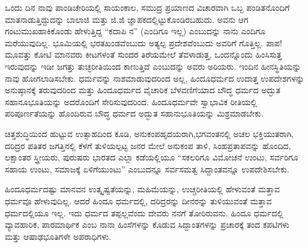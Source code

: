 ಒಂದು ದಿನ ನಾವು ಪಾಂಡಿಚೇರಿಯಲ್ಲಿ ಸಾಯಂಕಾಲ, ಸಮುದ್ರ ಪ್ರಯಾಣದ ವಿಚಾರವಾಗಿ ಒಬ್ಬ ಪಂಡಿತನೊಂದಿಗೆ ಮಾತನಾಡುತ್ತಿದ್ದುದನ್ನು ಬಾಲಾಜಿ ಮತ್ತು ಜಿ.ಜಿ ಜ್ಞಾಪಕದಲ್ಲಿಟ್ಟುಕೊಂಡಿರಬಹುದು. ಅವನು ಆಗ ಗಂಟುಮುಖಹಾಕಿಕೊಂಡು ಹೇಳುತ್ತಿದ್ದ “ಕದಾಪಿ ನ” (ಎಂದಿಗೂ ಇಲ್ಲ) ಎಂಬುದನ್ನು ನಾನು ಎಂದಿಗೂ ಮರೆಯುವುದಿಲ್ಲ. ಭೂಮಿಯಲ್ಲಿ ಭರತಖಂಡವೆಂಬುದು ಅತ್ಯಲ್ಪ ಪ್ರದೇಶವೆಂಬುದು ಅವರಿಗೆ ಗೊತ್ತಿಲ್ಲ. ಪಾಪ!ಮೂವತ್ತು ಕೋಟಿ ಮಾನವರು ಕೀಟಗಳಂತೆ ಸುಂದರ ತಿರೆಯಮೇಲೆ ತೆವಳಾಡುತ್ತ, ಒಂದನ್ನೊಂದು ಹಿಂಸಿಸುತ್ತ ಇರುವುದನ್ನು ಇಡೀ ಜಗತ್ತು ತುಚ್ಛರೀತಿಯಿಂದ ಕಾಣುತ್ತಿದೆ ಎಂಬುದನ್ನು ಅವರು ಅರಿಯರು. ಇಂದಿನ ಹೀನಸ್ಥಿತಿಯನ್ನು ನಾವು ಹೋಗಲಾಡಿಸಬೇಕು. ಧರ್ಮವನ್ನು ನಾಶಮಾಡುವುದರಿಂದ ಅಲ್ಲ, ಹಿಂದೂಧರ್ಮದ ಉದಾತ್ತ ಉಪದೇಶಗಳನ್ನು ಅನುಷ್ಠಾನಕ್ಕೆ ತರುವುದರಿಂದ ಮತ್ತು ಹಿಂದೂಧರ್ಮದ ವೈಚಾರಿಕ ಬೆಳವಣಿಗೆಯಾದ ಬೌದ್ಧ ಧರ್ಮದ ಅದ್ಭುತ ಸಹಾನೂಭೂತಿಯನ್ನು ಅದರೊಂದಿಗೆ ಸೇರಿಸುವುದರಿಂದ. ಹಿಂದೂಧರ್ಮವೇ ಸ್ವಾಭಾವಿಕ ರೀತಿಯಲ್ಲಿ ಪರಿಪೂರ್ಣತೆಯನ್ನು ಹೊಂದಿರುವ ಬೌದ್ಧ ಧರ್ಮದ ಅದ್ಭುತ ಸಹಾನುಭೂತಿಯನ್ನು ಮಿಶ್ರಮಾಡಬೇಕು.

ಚಿತ್ತಶುದ್ಧಿಯಿಂದ ಹುಟ್ಟುವ ಉತ್ಸಾಹದಿಂದ ಕೂಡಿ, ಅನುಕಂಪಹೃದಯರಾಗಿ,\break ಭಗವಂತನಲ್ಲಿ ಅಚಲ ಭಕ್ತಿಯುತರಾಗಿ, ದರಿದ್ರರ ಪತಿತರ ಜಗತ್ತಿನಲ್ಲಿ ಕೆಳಗೆ ತುಳಿಯಲ್ಪಟ್ಟ ಜನರ ಮೇಲೆ ಅನುಕಂಪ ತಾಳಿ, ಸಿಂಹಪ್ರತಾಪವನ್ನು ಹೊಂದಿದ, ಲಕ್ಷಾಂತರ ಸ್ತ್ರೀಯರು, ಪುರುಷರು ಭಾರತದ ಎಲ್ಲಾ ಕಡೆಯಲ್ಲಿಯೂ “ಸಕಲರಿಗೂ ವಿಮೋಚನೆ ಉಂಟು, ಸರ್ವರಿಗೂ ಸಹಾಯ ಉಂಟು, ಸಮಾಜಕ್ಕೆ ಏಳಿಗೆಯುಂಟು” ಎಂಬುದನ್ನೂ ಸರ್ವಸಮತ್ವ ಸಿದ್ದಾಂತವನ್ನೂ ಉಪದೇಶಿಸಬೇಕು.

ಹಿಂದೂಧರ್ಮದಷ್ಟು ಮಾನವನ ಉತ್ಕೃಷ್ಟತೆಯನ್ನು, ಮಹಿಮೆಯನ್ನು, ಉಚ್ಚರೀತಿಯಲ್ಲಿ ಹೇಳುವಂತೆ ಮತ್ತಾವ ಧರ್ಮವೂ ಹೇಳುವುದಿಲ್ಲ. ಆದರೆ ಹಿಂದೂ ಧರ್ಮದಲ್ಲಿ, ದರಿದ್ರರನ್ನು ದೀನರನ್ನು ತುಳಿಯುವಂತೆ ಮತ್ತಾವ ಧರ್ಮದಲ್ಲಿಯೂ ಇಲ್ಲ. ಇದು ಧರ್ಮದ ತಪ್ಪಲ್ಲವೆಂದು ದೇವರು ನನಗೆ ತೋರಿರುವನು. ಹಿಂದೂ ಧರ್ಮದಲ್ಲಿ ವ್ಯಾವಹಾರಿಕ, ಪಾರಮಾರ್ಥಿಕ ಎಂಬ ನಾನಾ ಹಿಂಸೆಗಳನ್ನು ಕೊಡುವ ಸಿದ್ದಾಂತಗಳನ್ನು ಪ್ರಚಾರಕ್ಕೆ ತಂದ ಕಪಟಿಗಳು ಮತ್ತು ಆಷಾಢಭೂತಿಗಳೇ ಅಪರಾಧಿಗಳು.

